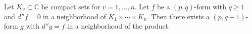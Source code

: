 Let $K_v \subset \mathbb{C}$ be compact sets for $v = 1, \ldots, n$. Let $f$ be a $(p, q)$-form with $q \geqslant 1$ and $d'' f = 0$ in a neighborhood of $K_1 \times \cdots \times K_n$. Then there exists a $(p, q-1)$-form $g$ with $d'' g = f$ in a neighborhood of the product.
